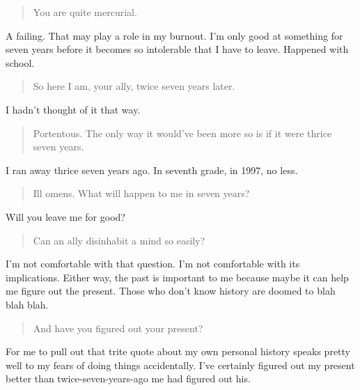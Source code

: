 \begin{quote}
You are quite mercurial.
\end{quote}

A failing. That may play a role in my burnout. I'm only good at something for seven years before it becomes so intolerable that I have to leave. Happened with school.

\begin{quote}
So here I am, your ally, twice seven years later.
\end{quote}

I hadn't thought of it that way.

\begin{quote}
Portentous. The only way it would've been more so is if it were thrice seven years.
\end{quote}

I ran away thrice seven years ago. In seventh grade, in 1997, no less.

\begin{quote}
Ill omens. What will happen to me in seven years?
\end{quote}

Will you leave me for good?

\begin{quote}
Can an ally disinhabit a mind so easily?
\end{quote}

I'm not comfortable with that question. I'm not comfortable with its implications. Either way, the past is important to me because maybe it can help me figure out the present. Those who don't know history are doomed to blah blah blah.

\begin{quote}
And have you figured out your present?
\end{quote}

For me to pull out that trite quote about my own personal history speaks pretty well to my fears of doing things accidentally. I've certainly figured out my present better than twice-seven-years-ago me had figured out his.
